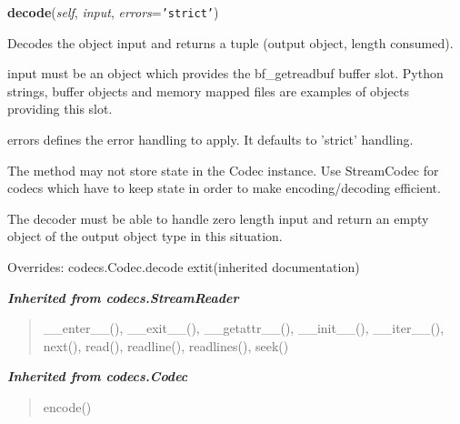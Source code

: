 \hspace{.8\funcindent}\begin{boxedminipage}{\funcwidth}

    \raggedright \textbf{decode}(\textit{self}, \textit{input}, \textit{errors}={\tt 'strict'})

\setlength{\parskip}{2ex}
    Decodes the object input and returns a tuple (output object, length 
    consumed).

    input must be an object which provides the bf\_getreadbuf buffer slot. 
    Python strings, buffer objects and memory mapped files are examples of 
    objects providing this slot.

    errors defines the error handling to apply. It defaults to 'strict' 
    handling.

    The method may not store state in the Codec instance. Use StreamCodec 
    for codecs which have to keep state in order to make encoding/decoding 
    efficient.

    The decoder must be able to handle zero length input and return an 
    empty object of the output object type in this situation.

\setlength{\parskip}{1ex}
      Overrides: codecs.Codec.decode 	extit{(inherited documentation)}

    \end{boxedminipage}


\large{\textbf{\textit{Inherited from codecs.StreamReader}}}

\begin{quote}
\_\_enter\_\_(), \_\_exit\_\_(), \_\_getattr\_\_(), \_\_init\_\_(), \_\_iter\_\_(), next(), read(), readline(), readlines(), seek()
\end{quote}

\large{\textbf{\textit{Inherited from codecs.Codec}}}

\begin{quote}
encode()
\end{quote}
